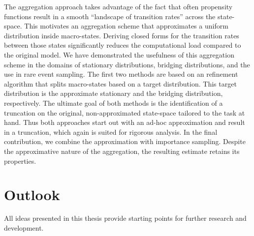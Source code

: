 The aggregation approach takes advantage of the fact that often propensity functions result in a smooth ``landscape of transition rates'' across the state-space.
This motivates an aggregation scheme that approximates a uniform distribution inside macro-states.
Deriving closed forms for the transition rates between those states significantly reduces the computational load compared to the original model.
We have demonstrated the usefulness of this aggregation scheme in the domains of stationary distributions, bridging distributions, and the use in rare event sampling.
The first two methods are based on an refinement algorithm that splits macro-states based on a target distribution. 
This target distribution is the approximate stationary and the bridging distribution, respectively.
The ultimate goal of both methods is the identification of a truncation on the original, non-approximated state-space tailored to the task at hand.
Thus both approaches start out with an ad-hoc approximation and result in a truncation, which again is suited for rigorous analysis.
In the final contribution, we combine the approximation with importance sampling.
Despite the approximative nature of the aggregation, the resulting estimate retains its properties.



\section{Outlook}
All ideas presented in this thesis provide starting points for further research and development.

